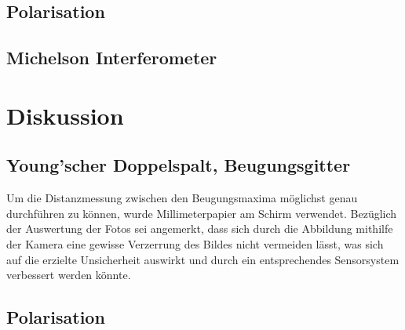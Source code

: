 \documentclass[12pt,english,ngerman]{scrartcl}
\begin{document}
\subsection{Polarisation}



\subsection{Michelson Interferometer}


\section{Diskussion}\label{sec:diskussion}

\subsection{Young'scher Doppelspalt, Beugungsgitter}

Um die Distanzmessung zwischen den Beugungsmaxima möglichst genau durchführen
zu können, wurde Millimeterpapier am Schirm verwendet. Bezüglich der Auswertung
der Fotos sei angemerkt, dass sich durch die Abbildung mithilfe der Kamera eine
gewisse Verzerrung des Bildes nicht vermeiden lässt, was sich auf die erzielte
Unsicherheit auswirkt und durch ein entsprechendes Sensorsystem verbessert
werden könnte.

\subsection{Polarisation}
\end{document}
